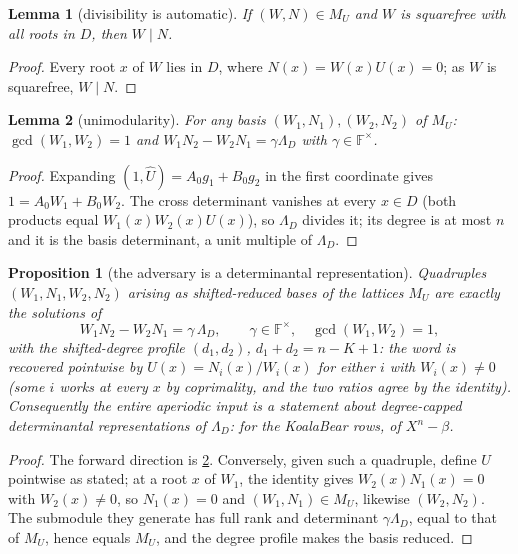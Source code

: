 \documentclass[11pt]{article}
\newtheorem{lemma}[lemma]{Lemma}
\newtheorem{proposition}[proposition]{Proposition}
\theoremstyle{definition}
\theoremstyle{remark}
\newcommand{\F}{\mathbb{F}}
\begin{document}
\begin{lemma}[divisibility is automatic]\label{lem:capfp-autodiv}
If $(W,N)\in M_U$ and $W$ is squarefree with all roots in $D$, then $W\mid N$.
\end{lemma}

\begin{proof}
Every root $x$ of $W$ lies in $D$, where $N(x)=W(x)U(x)=0$; as $W$ is squarefree, $W\mid N$.
\end{proof}

\begin{lemma}[unimodularity]\label{lem:capfp-unimodular}
For any basis $(W_1,N_1),(W_2,N_2)$ of $M_U$: $\gcd(W_1,W_2)=1$ and $W_1N_2-W_2N_1=\gamma\Lambda_D$ with $\gamma\in\F^\times$.
\end{lemma}

\begin{proof}
Expanding $(1,\widehat U)=A_0g_1+B_0g_2$ in the first coordinate gives $1=A_0W_1+B_0W_2$.  The cross determinant vanishes at every $x\in D$ \textup(both products equal $W_1(x)W_2(x)U(x)$\textup), so $\Lambda_D$ divides it; its degree is at most $n$ and it is the basis determinant, a unit multiple of $\Lambda_D$.
\end{proof}

\begin{proposition}[the adversary is a determinantal representation]\label{prop:capfp-detrep}
Quadruples $(W_1,N_1,W_2,N_2)$ arising as shifted-reduced bases of the lattices $M_U$ are exactly the solutions of
\[
        W_1N_2-W_2N_1=\gamma\,\Lambda_D,\qquad\gamma\in\F^\times,\quad\gcd(W_1,W_2)=1,
\]
with the shifted-degree profile $(d_1,d_2)$, $d_1+d_2=n-K+1$: the word is recovered pointwise by $U(x)=N_i(x)/W_i(x)$ for either $i$ with $W_i(x)\ne0$ \textup(some $i$ works at every $x$ by coprimality, and the two ratios agree by the identity\textup).  Consequently the entire aperiodic input is a statement about degree-capped determinantal representations of $\Lambda_D$: for the KoalaBear rows, of $X^n-\beta$.
\end{proposition}

\begin{proof}
The forward direction is \cref{lem:capfp-unimodular}.  Conversely, given such a quadruple, define $U$ pointwise as stated; at a root $x$ of $W_1$, the identity gives $W_2(x)N_1(x)=0$ with $W_2(x)\ne0$, so $N_1(x)=0$ and $(W_1,N_1)\in M_U$, likewise $(W_2,N_2)$.  The submodule they generate has full rank and determinant $\gamma\Lambda_D$, equal to that of $M_U$, hence equals $M_U$, and the degree profile makes the basis reduced.
\end{proof}
\end{document}
